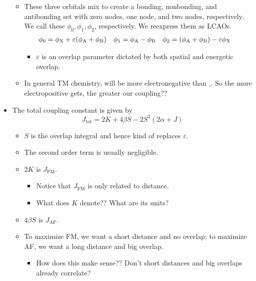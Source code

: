 \documentclass[../notes.tex]{subfiles}
\begin{document}
\begin{itemize}
\begin{itemize}
        \item These three orbitals mix to create a bonding, nonbonding, and antibonding set with zero nodes, one node, and two nodes, respectively. We call these $\phi_0,\phi_1,\phi_2$, respectively. We reexpress them as LCAOs.
        \begin{align*}
            \phi_0 &= \phi_{\ce{X}}+\varepsilon(\phi_{\ce{A}}+\phi_{\ce{B}})&
            \phi_1 &= \phi_{\ce{A}}-\phi_{\ce{B}}&
            \phi_2 &= (\phi_{\ce{A}}+\phi_{\ce{B}})-\varepsilon\phi_{\ce{X}}
        \end{align*}
        \begin{itemize}
            \item $\varepsilon$ is an overlap parameter dictated by both spatial and energetic overlap.
        \end{itemize}
        \item In general TM chemistry,  will be more electronegative than ,. So the more electropositive  gets, the greater our coupling??
    \end{itemize}
    \item The total coupling constant is given by
    \begin{equation*}
        J_\text{tot} = 2K+4\beta S-2S^2(2\alpha+J)
    \end{equation*}
    \begin{itemize}
        \item $S$ is the overlap integral and hence kind of replaces $\varepsilon$.
        \item The second order term is usually negligible.
        \item $2K$ is $J_\text{FM}$.
        \begin{itemize}
            \item Notice that $J_\text{FM}$ is only related to distance.
            \item What does $K$ denote?? What are its units?
        \end{itemize}
        \item $4\beta S$ is $J_\text{AF}$.
        \item To maximize FM, we want a short distance and no overlap; to maximize AF, we want a long distance and big overlap.
        \begin{itemize}
            \item How does this make sense?? Don't short distances and big overlaps already correlate?
        \end{itemize}

\end{itemize}
\end{itemize}
\end{document}
